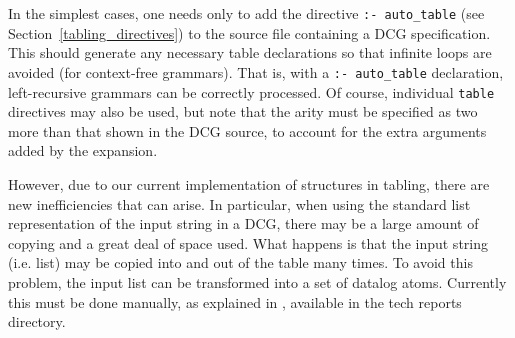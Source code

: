In the simplest cases, one needs only to add the directive
{\tt :- auto\_table} (see Section~\ref{tabling_directives}) to the source file
containing a DCG specification.  This should generate any necessary table
declarations so that infinite loops are avoided (for context-free grammars).
That is, with a {\tt :- auto\_table} declaration, left-recursive grammars can
be correctly processed.  Of course, individual {\tt table} directives may also
be used, but note that the arity must be specified as two more than that shown
in the DCG source, to account for the extra arguments added by the expansion.

However, due to our current implementation of structures in tabling, there are
new inefficiencies that can arise.  In particular, when using the standard
list representation of the input string in a DCG, there may be a large amount
of copying and a great deal of space used. What happens is that the input
string (i.e. list) may be copied into and out of the table many times.  To 
avoid this problem, the input list can be transformed into a set of datalog
atoms.  Currently this must be done manually, as explained in \cite{DSW93},
available in the tech reports directory.




